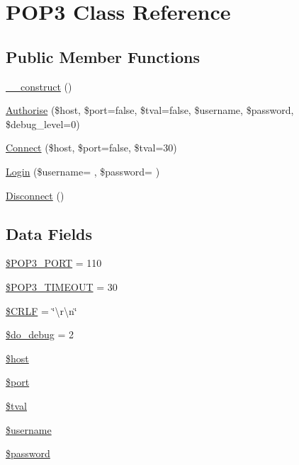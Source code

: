 \hypertarget{class_p_o_p3}{}\section{P\+O\+P3 Class Reference}
\label{class_p_o_p3}
\subsection*{Public Member Functions}
\begin{DoxyCompactItemize}
\item 
\hyperlink{class_p_o_p3_a095c5d389db211932136b53f25f39685}{\+\_\+\+\_\+construct} ()
\item 
\hyperlink{class_p_o_p3_a13fd56f2da506bfc2489ceee9ac55ebe}{Authorise} (\$host, \$port=false, \$tval=false, \$username, \$password, \$debug\+\_\+level=0)
\item 
\hyperlink{class_p_o_p3_a61136c8955214a74dd90cdbc2690dc75}{Connect} (\$host, \$port=false, \$tval=30)
\item 
\hyperlink{class_p_o_p3_a84303ab86c387d212c6ba82be1e31fe8}{Login} (\$username= \textquotesingle{}\textquotesingle{}, \$password= \textquotesingle{}\textquotesingle{})
\item 
\hyperlink{class_p_o_p3_aec617d8b732c15e5d5be216fee2b9bf5}{Disconnect} ()
\end{DoxyCompactItemize}
\subsection*{Data Fields}
\begin{DoxyCompactItemize}
\item 
\hyperlink{class_p_o_p3_a1b5e612c53a85355ca0a5ef5121becfb}{\$\+P\+O\+P3\+\_\+\+P\+O\+R\+T} = 110
\item 
\hyperlink{class_p_o_p3_a5a68cb992276c956e16214f08e62ce3a}{\$\+P\+O\+P3\+\_\+\+T\+I\+M\+E\+O\+U\+T} = 30
\item 
\hyperlink{class_p_o_p3_a75538b15bafd1ec1eaaa6ea0bbfa642a}{\$\+C\+R\+L\+F} = \char`\"{}\textbackslash{}r\textbackslash{}n\char`\"{}
\item 
\hyperlink{class_p_o_p3_a09ca59ee83fba6c8137646a13f1664d1}{\$do\+\_\+debug} = 2
\item 
\hyperlink{class_p_o_p3_a711797613cb863ca0756df789c396bf2}{\$host}
\item 
\hyperlink{class_p_o_p3_aa0787efab4b22e8a212882f3409d4c77}{\$port}
\item 
\hyperlink{class_p_o_p3_a19650abd43de047c5f64c5a1a84e4533}{\$tval}
\item 
\hyperlink{class_p_o_p3_a0eb82aa5f81cf845de4b36cd653c42cf}{\$username}
\item 
\hyperlink{class_p_o_p3_a607686ef9f99ea7c42f4f3dd3dbb2b0d}{\$password}
\end{DoxyCompactItemize}


